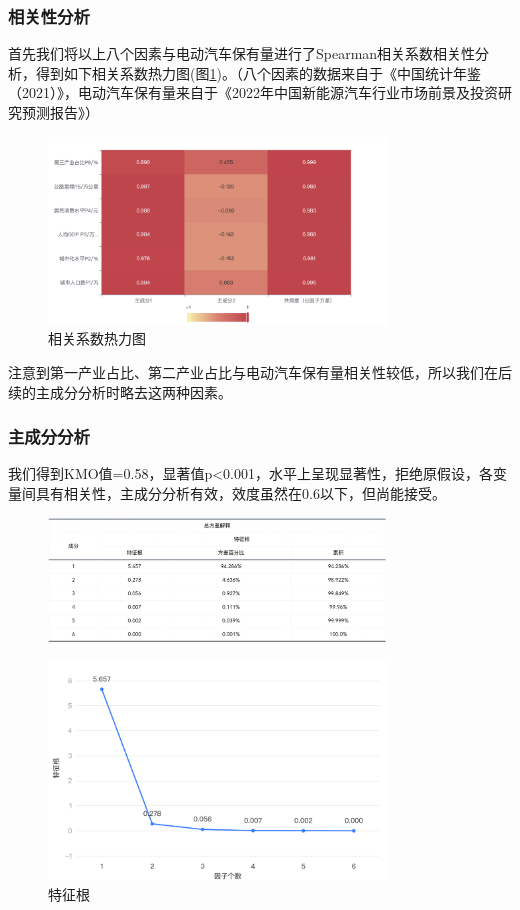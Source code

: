 \documentclass[12pt, a4paper, oneside]{ctexart}
\begin{document}
\subsubsection{相关性分析}
首先我们将以上八个因素与电动汽车保有量进行了Spearman相关系数相关性分析，得到如下相关系数热力图(图\ref{fig:相关系数热力图})。（八个因素的数据来自于《中国统计年鉴（2021）》\cite{cite:统计年鉴}，电动汽车保有量来自于《2022年中国新能源汽车行业市场前景及投资研究预测报告》\cite{cite:预测报告}）
\begin{figure}[h]
    \centering
    \includegraphics[width=0.8\textwidth]{pic/相关系数热力图.png}
    \caption{相关系数热力图}
    \label{fig:相关系数热力图}
\end{figure}

注意到第一产业占比、第二产业占比与电动汽车保有量相关性较低，所以我们在后续的主成分分析时略去这两种因素。
\subsubsection{主成分分析}
我们得到KMO值=0.58，显著值p<0.001，水平上呈现显著性，拒绝原假设，各变量间具有相关性，主成分分析有效，效度虽然在0.6以下，但尚能接受。
\begin{figure}[h]
    \centering
    \includegraphics[width=0.8\textwidth]{pic/KMO.png}
    \label{fig:方差解释表}
\end{figure}
\begin{figure}[h]
    \centering
    \includegraphics[width=0.8\textwidth]{pic/特征根.png}
    \caption{特征根}
    \label{fig:特征根}
\end{figure}
\end{document}
